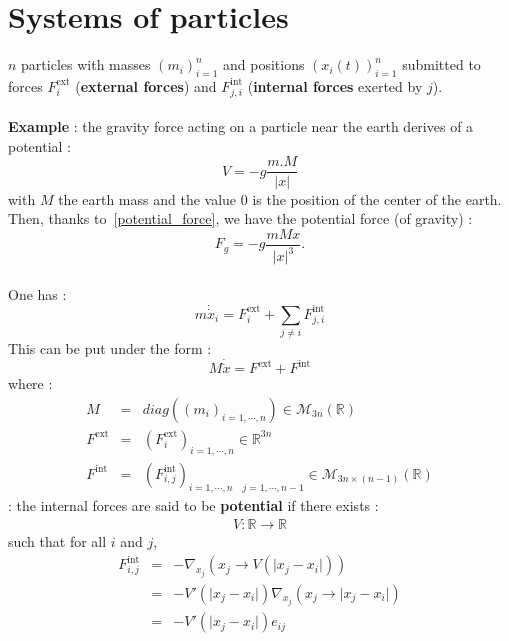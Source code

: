 \documentclass{report}
\newcommand*{\definition}[1]{\noindent\textbf{\color{cadmiumgreen}{#1}}}
\theoremstyle{plain}
\theoremstyle{definition}
\theoremstyle{remark}
\begin{document}
\section{Systems of particles}
$n$ particles with masses $(m_i)^n_{i=1}$ and positions $(x_i(t))^n_{i=1}$ submitted to forces $F_i^{\text{ext}}$ (\textbf{external forces}) and $F_{j,i}^{\text{int}}$ (\textbf{internal forces} exerted by $j$). \\ \\
\textbf{Example} : 
the gravity force acting on a particle near the earth derives of a potential :
\begin{equation*}
V = -g\frac{m.M}{\vert x \vert}
\end{equation*}
with $M$ the earth mass and the value $0$ is the position of the center of the earth. \\
Then, thanks to~\eqref{potential_force}, we have the potential force (of gravity) : 
\begin{equation*}
F_g = -g\frac{mMx}{\vert x \vert ^3}.
\end{equation*} \\
One has :
\begin{equation}
m\dot{\dot{x}}_i = F_i^{\text{ext}} + \sum_{j \neq i} F_{j,i}^{\text{int}}
\end{equation}
This can be put under the form :
\begin{equation}
M\dot{\dot{x}} = F^{\text{ext}} + F^{\text{int}}
\end{equation}
where : 
\begin{eqnarray}
M &=& diag\left((m_i)_{i=1,\cdots,n}\right) \in \mathcal{M}_{3n}(\mathbb{R}) \\
F^{\text{ext}} &=& \left(F_i^{\text{ext}}\right)_{i=1,\cdots,n} \in \mathbb{R}^{3n} \\
F^{\text{int}} &=& \left(F_{i,j}^{\text{int}}\right)_{i=1,\cdots,n \quad j=1,\cdots,{n-1}} \in \mathcal{M}_{3n \times (n-1)}(\mathbb{R})
\end{eqnarray}
\definition{To be 'potential'} : the internal forces are said to be \textbf{potential} if there exists :
\begin{eqnarray}
V : \mathbb{R} \rightarrow \mathbb{R}
\end{eqnarray}
such that for all $i$ and $j$,
\begin{eqnarray}
F_{i,j}^{\text{int}} &=& -\nabla_{x_j} \left(x_j \rightarrow V(\vert x_j-x_i\vert)\right) \\
&=& -V'(\vert x_j-x_i\vert)\nabla_{x_j} (x_j \rightarrow \vert x_j-x_i\vert) \\ 
&=& -V'(\vert x_j - x_i \vert) e_{ij}
\end{eqnarray}
\end{document}
